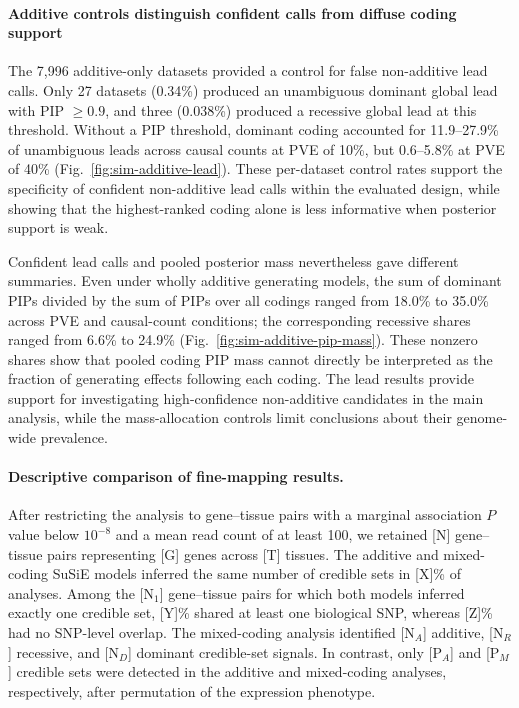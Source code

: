 \documentclass[12pt]{article}
\begin{document}
\paragraph{Additive controls distinguish confident calls from diffuse coding support}

The 7,996 additive-only datasets provided a control for false
non-additive lead calls. Only 27 datasets (0.34\%) produced an unambiguous
dominant global lead with PIP $\geq 0.9$, and three (0.038\%) produced
a recessive global lead at this threshold. Without a PIP threshold,
dominant coding accounted for 11.9--27.9\% of unambiguous leads across
causal counts at PVE of 10\%, but 0.6--5.8\% at PVE of 40\%
(Fig.~\ref{fig:sim-additive-lead}). These per-dataset control rates
support the specificity of confident non-additive lead calls within
the evaluated design, while showing that the highest-ranked coding
alone is less informative when posterior support is weak.

Confident lead calls and pooled posterior mass nevertheless
gave different summaries. Even under wholly additive generating models,
the sum of dominant PIPs divided by the sum of PIPs over all codings
ranged from 18.0\% to 35.0\% across PVE and causal-count conditions;
the corresponding recessive shares ranged from 6.6\% to 24.9\%
(Fig.~\ref{fig:sim-additive-pip-mass}). These nonzero shares show that
pooled coding PIP mass cannot directly be interpreted as the fraction
of generating effects following each coding. The lead results provide
support for investigating high-confidence non-additive candidates in
the main analysis, while the mass-allocation controls limit conclusions
about their genome-wide prevalence.


\paragraph{Descriptive comparison of fine-mapping results.}
After restricting the analysis to gene--tissue pairs with a marginal
association $P$ value below $10^{-8}$ and a mean read count of at
least 100, we retained [N] gene--tissue pairs representing [G] genes across
[T] tissues. The additive and mixed-coding SuSiE models inferred the same
number of credible sets in [X]\% of analyses. Among the [N$_1$] gene--tissue
pairs for which both models inferred exactly one credible set, [Y]\% shared
at least one biological SNP, whereas [Z]\% had no SNP-level overlap. The
mixed-coding analysis identified [N$_A$] additive, [N$_R$] recessive, and
[N$_D$] dominant credible-set signals. In contrast, only [P$_A$] and
[P$_M$] credible sets were detected in the additive and mixed-coding
analyses, respectively, after permutation of the expression phenotype.
\end{document}
